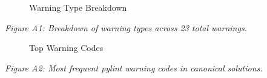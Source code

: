 
\begin{figure}[htbp]
\centering
\caption{Warning Type Breakdown}
\label{fig:warning_type_breakdown}
\end{figure}

\textit{Figure A1: Breakdown of warning types across 23 total warnings.}

\begin{figure}[htbp]
\centering
\caption{Top Warning Codes}
\label{fig:top_warning_codes}
\end{figure}

\textit{Figure A2: Most frequent pylint warning codes in canonical solutions.}
